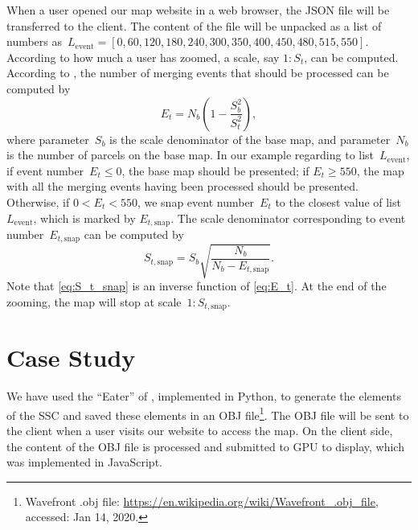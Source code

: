 \documentclass[ijgi,article,submit,moreauthors,pdftex]{Definitions/mdpi}
\begin{document}
When a user opened our map website in a web browser,
the JSON file will be transferred to the client.
The content of the file will be unpacked as a list of numbers 
as~$L_\mathrm{event} = 
[0, 60, 120, 180, 240, 300, 350, 400, 450, 480, 515, 550]$.
According to how much a user has zoomed,
a scale, say $1:S_t$, can be computed.
According to \citet{Huang2016Webmap},
the number of merging events that should be processed can be computed by
\begin{equation}
\label{eq:E_t}
E_t = N_b \left(1-\frac{S^2_b}{S^2_t}\right),
\end{equation}
where parameter~$S_b$ is the scale denominator of the base map,
and parameter~$N_b$ is the number of parcels on the base map.
In our example regarding to list~$L_\mathrm{event}$,
if event number~$E_t \le 0$, the base map should be presented;
if $E_t \ge 550$, the map with all the merging events having been processed
should be presented.
Otherwise, if $0<E_t < 550$, we snap event number~$E_t$ 
to the closest value of list~$L_\mathrm{event}$,
which is marked by $E_{t,\mathrm{snap}}$.
The scale denominator corresponding to event number~$E_{t,\mathrm{snap}}$
can be computed by 
\begin{equation}
\label{eq:S_t_snap}
S_{t,\mathrm{snap}} = S_b \sqrt{\frac{N_b}{N_b-E_{t,\mathrm{snap}}}}.
\end{equation}
Note that \eq\ref{eq:S_t_snap} is an inverse function of \eq\ref{eq:E_t}.
At the end of the zooming, the map will stop at scale~$1:S_{t,\mathrm{snap}}$.





\section{Case Study}

We have used the ``Eater'' of \citet{Suba2014Merge},
implemented in Python, 
to generate the elements of the SSC \citep{vanOosterom2014tGAPSSC} 
and saved these elements in an OBJ file\footnote{%
Wavefront .obj file:
\url{https://en.wikipedia.org/wiki/Wavefront_.obj_file},
accessed: Jan 14, 2020.}.
%
The OBJ file will be sent to the client 
when a user visits our website to access the map.
On the client side,
the content of the OBJ file is processed and submitted to GPU to display,
which was implemented in JavaScript.
\end{document}
